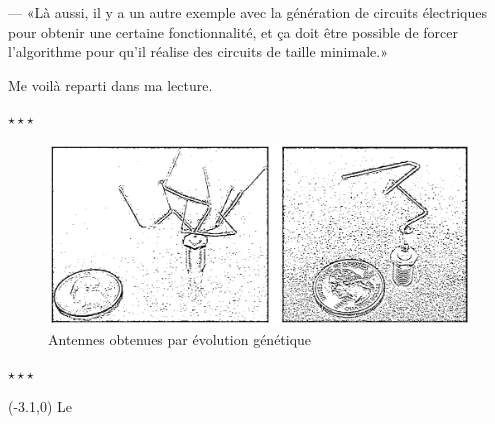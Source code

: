 \documentclass[letterpaper, 12pt]{report} %
\newcommand{\stardelimiter}{{\begin{center}\vspace{0.3cm} $\star \star \star$\vspace{0.25cm}\end{center}}}
\newcommand{\datemarge}[1]{%
    \begin{textblock}{3}(-3.1,0)
        {\color{blue}#1}
    \end{textblock}
}
\begin{document}
{--- «Là aussi, il y a un autre exemple avec la génération de circuits électriques pour obtenir une certaine fonctionnalité, et ça doit être possible de forcer l'algorithme pour qu'il réalise des circuits de taille minimale.»

Me voilà reparti dans ma lecture.

\vspace{-0.1cm}

\stardelimiter{}

\vspace{0.1cm}

\begin{figure}[h]
    \centering
    \includegraphics[width=13cm]{GeneticallyGrownAntennas_NASA-web.png} %
    \caption{Antennes obtenues par évolution génétique}
\end{figure}

\vspace{-1cm}

\stardelimiter{}


\newpage

\datemarge{Le}%

}
\end{document}
